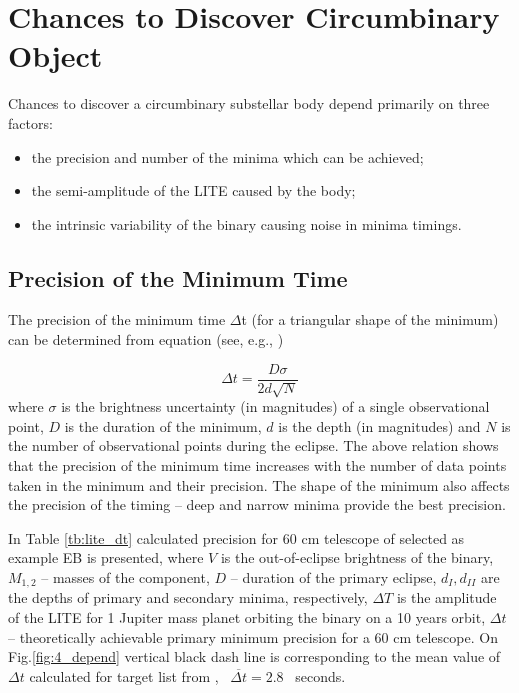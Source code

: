 \chapter{Chances to Discover Circumbinary Object}
\label{Chapter3}

Chances to discover a circumbinary substellar body depend primarily on three factors: 
\begin{itemize}[noitemsep]
\item the precision and number of the minima which can be achieved;
\item the semi-amplitude of the LITE caused by the body;
\item the intrinsic variability of the binary causing noise in minima timings.
\end{itemize}

\section{Precision of the Minimum Time}
The precision of the minimum time $\Delta$t (for a triangular shape of the minimum) can be determined from equation (see, e.g., \cite{sybilski2010})

\begin{equation}\label{eq:dt}
\Delta t = \dfrac{D \sigma}{2d\sqrt{N}}
\end{equation}
where $\sigma$ is the brightness uncertainty (in magnitudes) of a single observational point, $D$ is the duration of the minimum, $d$ is the depth (in magnitudes) and $N$ is the number of observational points during the eclipse. 
The above relation shows that the precision of the minimum time increases with the number of data points taken in the minimum and their precision. The shape of the minimum also affects the precision of the timing -- deep and narrow minima provide the best precision.

In Table \ref{tb:lite_dt} calculated precision for 60 cm telescope of selected as example EB is presented, where $V$ is the out-of-eclipse brightness of the binary, $M_{1,2}$ -- masses of the component, $D$ -- duration of the primary eclipse, $d_{I}, d_{II}$ are the depths of primary and secondary minima, respectively, $\Delta T$ is the amplitude of the LITE for 1 Jupiter mass planet orbiting the binary on a 10 years orbit,
$\Delta t$ -- theoretically achievable primary minimum precision for a 60 cm telescope. 
On Fig.\ref{fig:4_depend} vertical black dash line is corresponding to the mean value of $\Delta t$ calculated for target list from \cite{Pribula2012},~ $\overline{\Delta t} = 2.8$ ~seconds.

